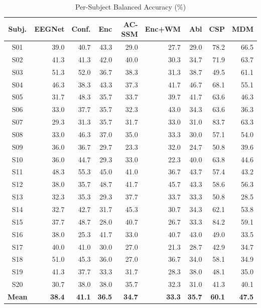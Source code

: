 \documentclass[journal]{IEEEtran}
\begin{document}
\begin{table}[t]
\centering
\caption{Per-Subject Balanced Accuracy (\%)}
\label{tab:persubject}
\setlength{\tabcolsep}{4pt}
\begin{tabular}{crrrrrrrr}
\toprule
\textbf{Subj.} & \textbf{EEGNet} & \textbf{Conf.} & \textbf{Enc} & \textbf{AC-SSM} & \textbf{Enc+WM} & \textbf{Abl} & \textbf{CSP} & \textbf{MDM} \\
\midrule
S01 & 39.0 & 40.7 & 43.3 & 29.0 & 27.7 & 29.0 & 78.2 & 66.5 \\
S02 & 41.3 & 41.3 & 42.0 & 40.0 & 30.3 & 34.7 & 71.9 & 63.7 \\
S03 & 51.3 & 52.0 & 36.7 & 38.3 & 31.3 & 38.7 & 49.5 & 61.1 \\
S04 & 46.3 & 38.3 & 43.3 & 37.3 & 41.7 & 46.7 & 68.1 & 55.1 \\
S05 & 31.7 & 48.3 & 35.7 & 33.7 & 39.7 & 41.7 & 63.6 & 46.3 \\
S06 & 33.0 & 37.7 & 35.7 & 32.3 & 43.0 & 34.3 & 63.6 & 36.3 \\
S07 & 29.3 & 31.3 & 35.7 & 31.7 & 33.0 & 31.0 & 83.7 & 63.3 \\
S08 & 33.0 & 46.3 & 37.0 & 35.0 & 33.3 & 30.0 & 57.1 & 54.0 \\
S09 & 36.0 & 36.7 & 29.7 & 23.3 & 32.0 & 24.7 & 50.8 & 39.6 \\
S10 & 36.0 & 44.7 & 29.3 & 33.0 & 22.3 & 40.0 & 63.8 & 44.6 \\
S11 & 48.3 & 55.3 & 45.0 & 41.0 & 36.7 & 43.7 & 57.4 & 43.2 \\
S12 & 38.0 & 35.7 & 48.7 & 41.7 & 45.7 & 43.3 & 58.6 & 56.3 \\
S13 & 32.3 & 35.3 & 29.3 & 37.7 & 33.7 & 33.3 & 50.8 & 28.5 \\
S14 & 32.7 & 42.7 & 31.7 & 45.3 & 30.7 & 34.3 & 62.1 & 53.8 \\
S15 & 37.7 & 48.7 & 28.0 & 40.7 & 26.7 & 33.3 & 84.2 & 59.1 \\
S16 & 38.0 & 25.3 & 41.7 & 33.0 & 40.7 & 43.0 & 49.0 & 33.5 \\
S17 & 40.0 & 41.0 & 30.0 & 27.0 & 21.3 & 28.7 & 42.9 & 34.7 \\
S18 & 51.0 & 45.3 & 36.0 & 27.0 & 36.7 & 34.0 & 58.1 & 34.9 \\
S19 & 41.3 & 37.7 & 33.3 & 31.7 & 28.3 & 38.0 & 48.1 & 35.0 \\
S20 & 30.7 & 38.0 & 38.0 & 35.7 & 32.3 & 31.0 & 41.3 & 40.1 \\
\midrule
\textbf{Mean} & \textbf{38.4} & \textbf{41.1} & \textbf{36.5} & \textbf{34.7} & \textbf{33.3} & \textbf{35.7} & \textbf{60.1} & \textbf{47.5} \\

\end{tabular}
\end{table}
\end{document}
